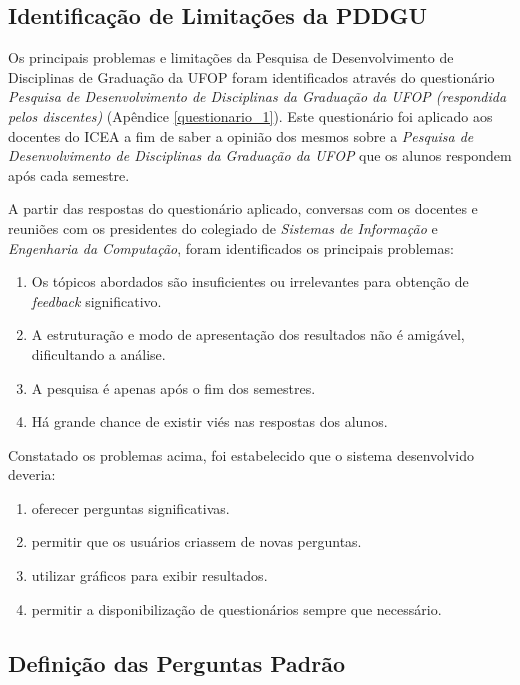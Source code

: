 \documentclass[
  12pt,       %
  openright,      %
  oneside,      %
  a4paper,      %
  english,      %
  french,        %
  spanish,     %
  brazil        %
  ]{abntex2-decsi}
\begin{document}
    \subsection{Identificação de Limitações da PDDGU}

    Os principais problemas e limitações da Pesquisa de Desenvolvimento de Disciplinas de Graduação da UFOP foram identificados através do questionário \textit{Pesquisa de Desenvolvimento de Disciplinas da Graduação da UFOP (respondida pelos discentes)} (Apêndice \ref{questionario_1}). Este questionário foi aplicado aos docentes do ICEA a fim de saber a opinião dos mesmos sobre a \textit{Pesquisa de Desenvolvimento de Disciplinas da Graduação da UFOP} que os alunos respondem após cada semestre. 

    A partir das respostas do questionário aplicado, conversas com os docentes e reuniões com os presidentes do colegiado de \textit{Sistemas de Informação} e \textit{Engenharia da Computação}, foram identificados os principais problemas:

    \begin{enumerate}
    \item Os tópicos abordados são insuficientes ou irrelevantes para obtenção de \textit{feedback} significativo.
    \item A estruturação e modo de apresentação dos resultados não é amigável, dificultando a análise.
    \item A pesquisa é apenas após o fim dos semestres.
    \item Há grande chance de existir viés nas respostas dos alunos.
    \end{enumerate}

    Constatado os problemas acima, foi estabelecido que o sistema desenvolvido deveria: 
    
    \begin{enumerate}
    	\item oferecer perguntas significativas.
        \item permitir que os usuários criassem de novas perguntas.
        \item utilizar gráficos para exibir resultados.
        \item permitir a disponibilização de questionários sempre que necessário.
    \end{enumerate} 

    \subsection{Definição das Perguntas Padrão}
\end{document}
